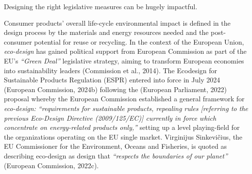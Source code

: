 \documentclass[
  12pt,
  letterpaper,
  DIV=11,
  numbers=noendperiod]{scrartcl}
\begin{document}
Designing the right legislative measures can be hugely impactful.

Consumer products' overall life-cycle environmental impact is defined in
the design process by the materials and energy resources needed and the
post-consumer potential for reuse or recycling. In the context of the
European Union, \emph{eco-design} has gained political support from
European Commission as part of the EU's \emph{``Green Deal''}
legislative strategy, aiming to transform European economies into
sustainability leaders (Commission et al., 2014). The Ecodesign for
Sustainable Products Regulation (ESPR) entered into force in July 2024
(European Commission, 2024b) following the (European Parliament, 2022)
proposal whereby the European Commission established a general framework
for \emph{eco-design: ``requirements for sustainable products, repealing
rules {[}referring to the previous Eco-Design Directive (2009/125/EC){]}
currently in force which concentrate on energy-related products only,''}
setting up a level playing-field for the organizations operating on the
EU single market. Virginijus Sinkevičius, the EU Commissioner for the
Environment, Oceans and Fisheries, is quoted as describing eco-design as
design that \emph{``respects the boundaries of our planet''} (European
Commission, 2022c).

\def\pandoctableshortcapt{The Qualities of \emph{Eco-Designed Products}}
\end{document}
